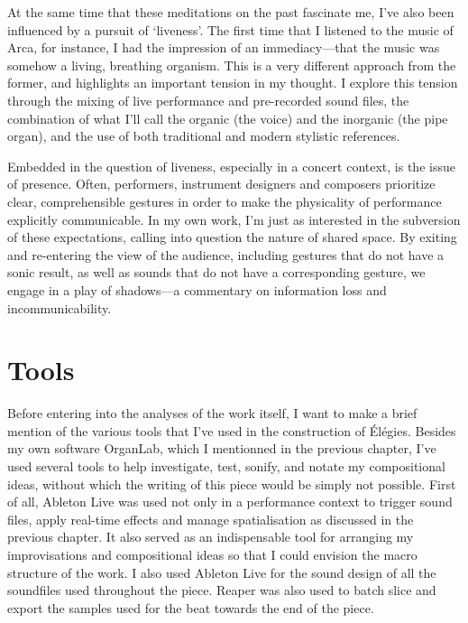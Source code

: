 \documentclass[12pt,twoside,maitrise]{dms_ks}
\theoremstyle{definition}
\begin{document}
{{At the same time that these meditations on the past fascinate me, I've also been influenced by a pursuit of `liveness'. 
The first time that I listened to the music of Arca, for instance, I had the impression of an immediacy---that the music was somehow a living, breathing organism. 
This is a very different approach from the former, and highlights an important tension in my thought. 
I explore this tension through the mixing of live performance and pre-recorded sound files, the combination of what I'll call the organic (the voice) and the inorganic (the pipe organ), and the use of both traditional and modern stylistic references.

Embedded in the question of liveness, especially in a concert context, is the issue of presence. 
Often, performers, instrument designers and composers prioritize clear, comprehensible gestures in order to make the physicality of performance explicitly communicable. 
In my own work, I'm just as interested in the subversion of these expectations, calling into question the nature of shared space. 
By exiting and re-entering the view of the audience, including gestures that do not have a sonic result, as well as sounds that do not have a corresponding gesture, we engage in a play of shadows---a commentary on information loss and incommunicability. 

\section{Tools}

Before entering into the analyses of the work itself, I want to make a brief mention of the various tools that I've used in the construction of Élégies. 
Besides my own software OrganLab, which I mentionned in the previous chapter, I've used several tools to help investigate, test, sonify, and notate my compositional ideas, without which the writing of this piece would be simply not possible. 
First of all, Ableton Live was used not only in a performance context to trigger sound files, apply real-time effects and manage spatialisation as discussed in the previous chapter. 
It also served as an indispensable tool for arranging my improvisations and compositional ideas so that I could envision the macro structure of the work. 
I also used Ableton Live for the sound design of all the soundfiles used throughout the piece. 
Reaper was also used to batch slice and export the samples used for the beat towards the end of the piece.

}}
\end{document}
